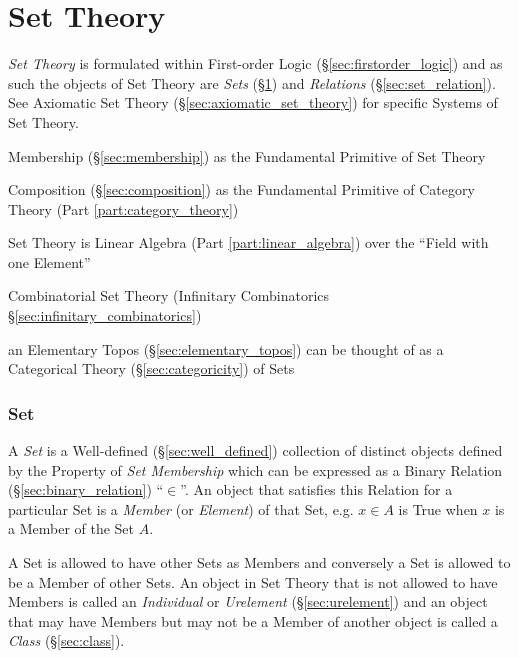 \part{Set Theory}\label{part:set_theory}

\emph{Set Theory} is formulated within First-order Logic
(\S\ref{sec:firstorder_logic}) and as such the objects of Set Theory
are \emph{Sets} (\S\ref{sec:set}) and \emph{Relations}
(\S\ref{sec:set_relation}). See Axiomatic Set Theory
(\S\ref{sec:axiomatic_set_theory}) for specific Systems of Set Theory.

Membership (\S\ref{sec:membership}) as the Fundamental Primitive of Set
Theory

Composition (\S\ref{sec:composition}) as the Fundamental Primitive of
Category Theory (Part \ref{part:category_theory})

Set Theory is Linear Algebra (Part \ref{part:linear_algebra}) over the
``Field with one Element'' %

Combinatorial Set Theory (Infinitary Combinatorics
\S\ref{sec:infinitary_combinatorics})

an Elementary Topos (\S\ref{sec:elementary_topos}) can be thought of as a
Categorical Theory (\S\ref{sec:categoricity}) of Sets



\section{Set}\label{sec:set}

A \emph{Set} is a Well-defined (\S\ref{sec:well_defined}) collection
of distinct objects defined by the Property of \emph{Set Membership}
which can be expressed as a Binary Relation
(\S\ref{sec:binary_relation}) ``$\in$''. An object that satisfies this
Relation for a particular Set is a \emph{Member} (or \emph{Element})
of that Set, e.g. $x \in A$ is True when $x$ is a Member of the Set
$A$.

A Set is allowed to have other Sets as Members and conversely a Set is
allowed to be a Member of other Sets. An object in Set Theory that is
not allowed to have Members is called an \emph{Individual} or
\emph{Urelement} (\S\ref{sec:urelement}) and an object that may have
Members but may not be a Member of another object is called a
\emph{Class} (\S\ref{sec:class}).

